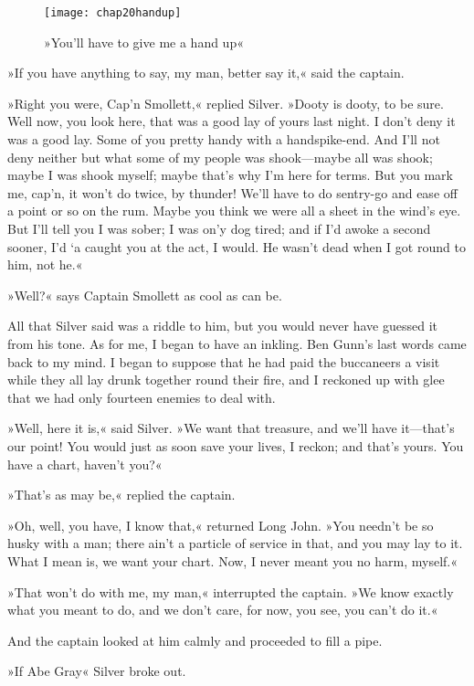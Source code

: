   \begin{figure}[p]
\centering
\texttt{[image: chap20handup]}
\caption{»You'll have to give me a hand up«}
\end{figure}  

»If you have anything to say, my man, better say it,« said the captain.

»Right you were, Cap'n Smollett,« replied Silver. »Dooty is dooty, to be sure. Well now, you look here, that was a good lay of yours last night. I don't deny it was a good lay. Some of you pretty handy with a handspike-end. And I'll not deny neither but what some of my people was shook—maybe all was shook; maybe I was shook myself; maybe that's why I'm here for terms. But you mark me, cap'n, it won't do twice, by thunder! We'll have to do sentry-go and ease off a point or so on the rum. Maybe you think we were all a sheet in the wind's eye. But I'll tell you I was sober; I was on'y dog tired; and if I'd awoke a second sooner, I'd `a caught you at the act, I would. He wasn't dead when I got round to him, not he.«

»Well?« says Captain Smollett as cool as can be.

All that Silver said was a riddle to him, but you would never have guessed it from his tone. As for me, I began to have an inkling. Ben Gunn's last words came back to my mind. I began to suppose that he had paid the buccaneers a visit while they all lay drunk together round their fire, and I reckoned up with glee that we had only fourteen enemies to deal with.

»Well, here it is,« said Silver. »We want that treasure, and we'll have it—that's our point! You would just as soon save your lives, I reckon; and that's yours. You have a chart, haven't you?«

»That's as may be,« replied the captain.

»Oh, well, you have, I know that,« returned Long John. »You needn't be so husky with a man; there ain't a particle of service in that, and you may lay to it. What I mean is, we want your chart. Now, I never meant you no harm, myself.«

»That won't do with me, my man,« interrupted the captain. »We know exactly what you meant to do, and we don't care, for now, you see, you can't do it.«

And the captain looked at him calmly and proceeded to fill a pipe.

»If Abe Gray\longdash« Silver broke out.

